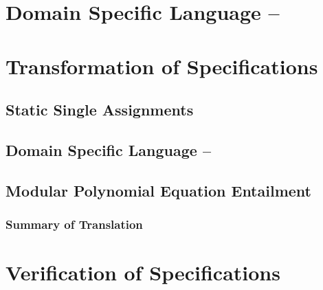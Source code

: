 \documentclass[sigconf, anonymous]{acmart}
\begin{document}
\section{Domain Specific Language -- \bvdsl}
\label{section:domain-specific-language-bvdsl}



\section{Transformation of Specifications}
\label{section:translation}


\subsection{Static Single Assignments}
\label{subsection:translation:static-single-assignment}


\subsection{Domain Specific Language -- \zdsl}
\label{subsection:domain-specific-language-zdsl}


%

\subsection{Modular Polynomial Equation Entailment}
\label{subsection:translation:multivariant-polynomial-equations}


\subsubsection*{Summary of Translation}



\section{Verification of Specifications}
\label{section:verification-of-specifications}

\end{document}

